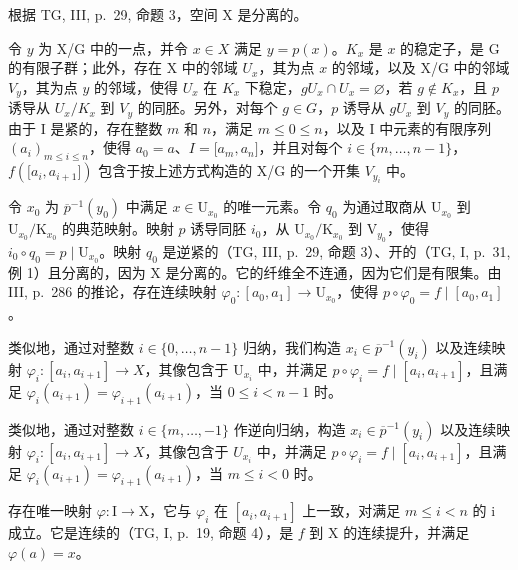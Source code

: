 根据 TG, III, p.~29, 命题 3，空间 X 是分离的。

令 \(y\) 为 X/G 中的一点，并令 \(x \in X\) 满足 \(y = p(x)\)。\(K_x\) 是 \(x\) 的稳定子，是 G 的有限子群；此外，存在 X 中的邻域 \(U_x\)，其为点 \(x\) 的邻域，以及 X/G 中的邻域 \(V_y\)，其为点 \(y\) 的邻域，使得 \(U_x\) 在 \(K_x\) 下稳定，\(gU_x \cap U_x = \varnothing\)，若 \(g \notin K_x\)，且 \(p\) 诱导从 \(U_x/K_x\) 到 \(V_y\) 的同胚。另外，对每个 \(g \in G\)，\(p\) 诱导从 \(gU_x\) 到 \(V_y\) 的同胚。由于 I 是紧的，存在整数 \(m\) 和 \(n\)，满足 \(m \leqslant 0 \leqslant n\)，以及 I 中元素的有限序列 \((a_i)_{m \leqslant i \leqslant n}\)，使得 \(a_0 = a\)、\(I = {[}a_m,a_n{]}\)，并且对每个 \(i \in \{m, \ldots, n-1\}\)，\(f({[}a_i,a_{i+1}{]})\) 包含于按上述方式构造的 X/G 的一个开集 \(V_{y_i}\) 中。

令 \(x_0\) 为 \(\overline{p}^{-1}(y_0)\) 中满足 \(x \in \mathrm{U}_{x_0}\) 的唯一元素。令 \(q_0\) 为通过取商从 \(\mathrm{U}_{x_0}\) 到 \(\mathrm{U}_{x_0}/\mathrm{K}_{x_0}\) 的典范映射。映射 \(p\) 诱导同胚 \(i_0\)，从 \(\mathrm{U}_{x_0}/\mathrm{K}_{x_0}\) 到 \(\mathrm{V}_{y_0}\)，使得 \(i_0 \circ q_0 = p \mid \mathrm{U}_{x_0}\)。映射 \(q_0\) 是逆紧的（TG, III, p.~29, 命题 3）、开的（TG, I, p.~31, 例 1）且分离的，因为 X 是分离的。它的纤维全不连通，因为它们是有限集。由 III, p.~286 的推论，存在连续映射 \(\varphi_0\colon [a_0,a_1]\to \mathrm{U}_{x_0}\)，使得 \(p\circ \varphi_0 = f\mid [a_0,a_1]\)。

类似地，通过对整数 \(i \in \{0, \ldots, n-1\}\) 归纳，我们构造 \(x_i \in \overline{p}^{-1}(y_i)\) 以及连续映射 \(\varphi_i: [a_i, a_{i+1}] \to X\)，其像包含于 \(\mathrm{U}_{x_i}\) 中，并满足 \(p \circ \varphi_i = f \mid [a_i, a_{i+1}]\)，且满足 \(\varphi_i(a_{i+1}) = \varphi_{i+1}(a_{i+1})\)，当 \(0 \leqslant i < n-1\) 时。

类似地，通过对整数 \(i \in \{m, \ldots, -1\}\) 作逆向归纳，构造 \(x_i \in \overline{p}^{-1}(y_i)\) 以及连续映射 \(\varphi_i: [a_i, a_{i+1}] \to X\)，其像包含于 \(U_{x_i}\) 中，并满足 \(p \circ \varphi_i = f \mid [a_i, a_{i+1}]\)，且满足 \(\varphi_i(a_{i+1}) = \varphi_{i+1}(a_{i+1})\)，当 \(m \leqslant i < 0\) 时。

存在唯一映射 \(\varphi\colon\mathrm{I}\to\mathrm{X}\)，它与 \(\varphi_{i}\) 在 \([a_{i},a_{i+1}]\) 上一致，对满足 \(m\leqslant i<n\) 的 i 成立。它是连续的（TG, I, p.~19, 命题 4），是 \(f\) 到 X 的连续提升，并满足 \(\varphi(a)=x\)。

